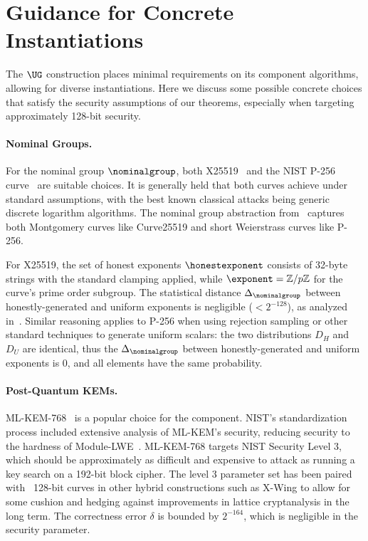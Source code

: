 \section{Guidance for Concrete Instantiations}\label{sec:concrete}

The $\UG$ construction places minimal requirements on its component
algorithms, allowing for diverse instantiations. Here we discuss some
possible concrete choices that satisfy the security assumptions of our
theorems, especially when targeting approximately 128-bit security.

\paragraph{Nominal Groups.}
For the nominal group $\nominalgroup$, both X25519~\cite{RFC7748} and the
NIST P-256 curve~\cite{NIST.SP.800.186} are suitable choices. It is generally
held that both curves achieve \sdh under standard assumptions, with the best
known classical attacks being generic discrete logarithm algorithms. The
nominal group abstraction from~\cite{EC:ABHKLR21} captures both Montgomery
curves like Curve25519 and short Weierstrass curves like P-256.

For X25519, the set of honest exponents $\honestexponent$ consists of 32-byte
strings with the standard clamping applied, while $\exponent =
\mathbb{Z}/p\mathbb{Z}$ for the curve's prime order subgroup. The statistical
distance $\Delta_{\nominalgroup}$ between honestly-generated and uniform
exponents is negligible ($< 2^{-128}$), as analyzed
in~\cite{EC:ABHKLR21,CiC:BCDKSV24}. Similar reasoning applies to P-256 when
using rejection sampling or other standard techniques to generate uniform
scalars: the two distributions $D_H$ and $D_U$ are identical, thus the
$\Delta_{\nominalgroup}$ between honestly-generated and uniform exponents is
0, and all elements have the same probability.

\paragraph{Post-Quantum KEMs.}
ML-KEM-768~\cite{FIPS203} is a popular choice for the \indcca \kem
component. NIST's standardization process included extensive analysis of
ML-KEM's \indcca security, reducing \indcca security to the hardness of
Module-LWE~\cite{EUROSP:BDKLLSSSS18}. ML-KEM-768 targets NIST Security Level
3, which should be approximately as difficult and expensive to attack as
running a key search on a 192-bit block cipher. The level 3 parameter set has
been paired with ~128-bit curves in other hybrid constructions such as X-Wing
to allow for some cushion and hedging against improvements in lattice
cryptanalysis in the long term. The correctness error $\delta$ is bounded by
$2^{-164}$, which is negligible in the security parameter.

